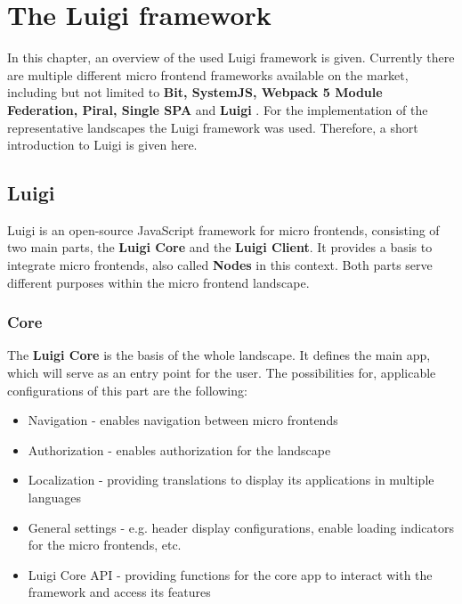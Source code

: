 \chapter{The Luigi framework} %
\label{Chapter2}


In this chapter, an overview of the used Luigi framework is given. Currently there are multiple different micro frontend frameworks available on the market, including but not limited to \textbf{Bit, SystemJS, Webpack 5 Module Federation, Piral, Single SPA} and \textbf{Luigi} \cite{top10_mffs}.
For the implementation of the representative landscapes the Luigi framework was used. Therefore, a short introduction to Luigi is given here.

\section{Luigi}

Luigi is an open-source JavaScript framework for micro frontends, consisting of two main parts, the \textbf{Luigi Core} and the \textbf{Luigi Client}. It provides a basis to integrate micro frontends, also called \textbf{Nodes} in this context. Both parts serve different purposes within the micro frontend landscape.\cite{luigi_doc_overview}

\subsection{Core}

The \textbf{Luigi Core} is the basis of the whole landscape. It defines the main app, which will serve as an entry point for the user. The possibilities for, applicable configurations of this part are the following:

\begin{itemize}[noitemsep]
	\item Navigation - enables navigation between micro frontends
	\item Authorization - enables authorization for the landscape
	\item Localization - providing translations to display its applications in multiple languages
	\item General settings - e.g. header display configurations, enable loading indicators for the micro frontends, etc.
	\item Luigi Core API - providing functions for the core app to interact with the framework and access its features
\end{itemize} 


